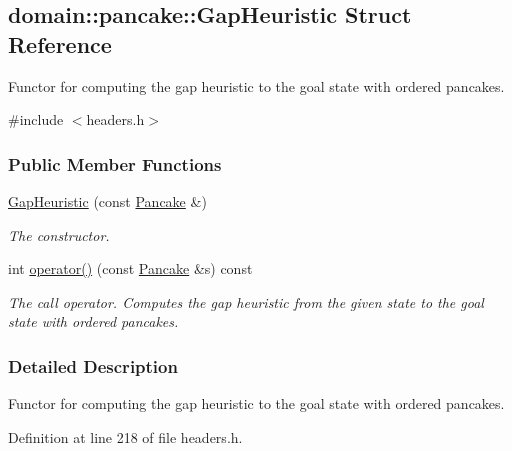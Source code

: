 \hypertarget{structdomain_1_1pancake_1_1GapHeuristic}{}\subsection{domain\+:\+:pancake\+:\+:Gap\+Heuristic Struct Reference}
\label{structdomain_1_1pancake_1_1GapHeuristic}


Functor for computing the gap heuristic to the goal state with ordered pancakes.  




{\ttfamily \#include $<$headers.\+h$>$}

\subsubsection*{Public Member Functions}
\begin{DoxyCompactItemize}
\item 
\hyperlink{structdomain_1_1pancake_1_1GapHeuristic_a39eda207031fee30fa063f9c9ecaf27c}{Gap\+Heuristic} (const \hyperlink{structdomain_1_1pancake_1_1Pancake}{Pancake} \&)\hypertarget{structdomain_1_1pancake_1_1GapHeuristic_a39eda207031fee30fa063f9c9ecaf27c}{}\label{structdomain_1_1pancake_1_1GapHeuristic_a39eda207031fee30fa063f9c9ecaf27c}

\begin{DoxyCompactList}\small\item\em The constructor. \end{DoxyCompactList}\item 
int \hyperlink{structdomain_1_1pancake_1_1GapHeuristic_a842b7e79fddd81a59619b77abbbffe4a}{operator()} (const \hyperlink{structdomain_1_1pancake_1_1Pancake}{Pancake} \&s) const 
\begin{DoxyCompactList}\small\item\em The call operator. Computes the gap heuristic from the given state to the goal state with ordered pancakes. \end{DoxyCompactList}\end{DoxyCompactItemize}


\subsubsection{Detailed Description}
Functor for computing the gap heuristic to the goal state with ordered pancakes. 

Definition at line 218 of file headers.\+h.



